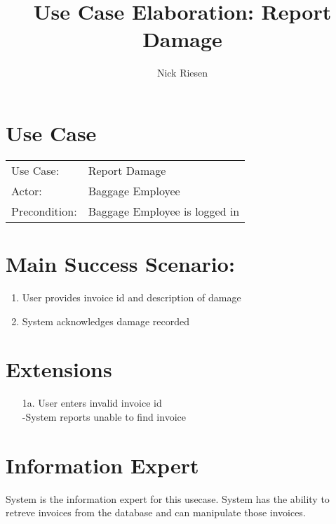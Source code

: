 \documentclass{article}
\title{Use Case Elaboration: Report Damage}
\author{ Nick Riesen }
\begin{document}
\maketitle


\section*{Use Case}
\begin{tabular}{l l}
Use Case:     & Report Damage                \\
Actor:        & Baggage Employee              \\
Precondition: & Baggage Employee is logged in \\
\end{tabular}


\section*{Main Success Scenario:}

\begin{enumerate}
    \item  User provides invoice id and description of damage
    \item System acknowledges damage recorded

\end{enumerate}

\section*{Extensions}

\begin{itemize}
    \item [1a.] User enters invalid invoice id \\
        -System reports unable to find invoice

\end{itemize}

\section*{Information Expert}

System is the information expert for this usecase. System has the ability to retreve invoices from the database and can manipulate those invoices.
\end{document}
